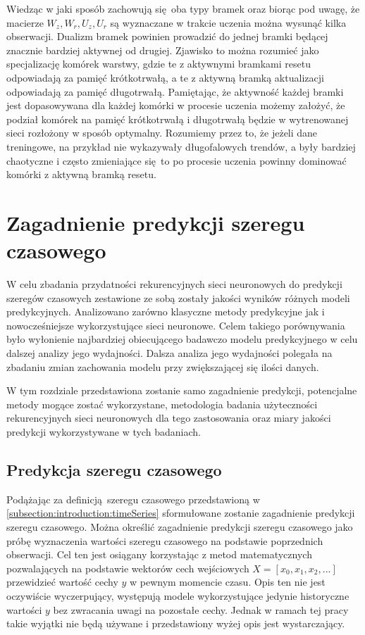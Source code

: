 \documentclass[10pt,a4paper]{article}
\begin{document}
Wiedząc w jaki sposób zachowują się oba typy bramek oraz biorąc pod uwagę, że macierze $W_z, W_r, U_z, U_r$ są wyznaczane w trakcie uczenia można wysunąć kilka obserwacji. Dualizm bramek powinien prowadzić do jednej bramki będącej znacznie bardziej aktywnej od drugiej. Zjawisko to można rozumieć jako specjalizację komórek warstwy, gdzie te z aktywnymi bramkami resetu odpowiadają za pamięć krótkotrwałą, a te z aktywną bramką aktualizacji odpowiadają za pamięć długotrwałą. Pamiętając, że aktywność każdej bramki jest dopasowywana dla każdej komórki w procesie uczenia możemy założyć, że podział komórek na pamięć krótkotrwałą i długotrwałą będzie w wytrenowanej sieci rozłożony w sposób optymalny. Rozumiemy przez to, że jeżeli dane treningowe, na przykład nie wykazywały długofalowych trendów, a były bardziej chaotyczne i często zmieniające się to po procesie uczenia powinny dominować komórki z aktywną bramką resetu.

\newpage
\section{Zagadnienie predykcji szeregu czasowego}
\label{section:methods}
W celu zbadania przydatności rekurencyjnych sieci neuronowych do predykcji szeregów czasowych zestawione ze sobą zostały jakości wyników różnych modeli predykcyjnych. Analizowano zarówno klasyczne metody predykcyjne jak i nowocześniejsze wykorzystujące sieci neuronowe. Celem takiego porównywania było wyłonienie najbardziej obiecującego badawczo modelu predykcyjnego w celu dalszej analizy jego wydajności. Dalsza analiza jego wydajności polegała na zbadaniu zmian zachowania modelu przy zwiększającej się ilości danych. 

W tym rozdziale przedstawiona zostanie samo zagadnienie predykcji, potencjalne metody mogące zostać wykorzystane, metodologia badania użyteczności rekurencyjnych sieci neuronowych dla tego zastosowania oraz miary jakości predykcji wykorzystywane w tych badaniach. 
\subsection{Predykcja szeregu czasowego}
Podążając za definicją szeregu czasowego przedstawioną w \autoref{subsection:introduction:timeSeries} sformułowane zostanie zagadnienie predykcji szeregu czasowego. Można określić zagadnienie predykcji szeregu czasowego jako próbę wyznaczenia wartości szeregu czasowego na podstawie poprzednich obserwacji. Cel ten jest osiągany korzystając z metod matematycznych pozwalających na podstawie wektorów cech wejściowych $X =[x_0, x_1, x_2, ...]$ przewidzieć wartość cechy $y$ w pewnym momencie czasu. Opis ten nie jest oczywiście wyczerpujący, występują modele wykorzystujące jedynie historyczne wartości $y$ bez zwracania uwagi na pozostałe cechy. Jednak w ramach tej pracy takie wyjątki nie będą używane i przedstawiony wyżej opis jest wystarczający.
\end{document}
